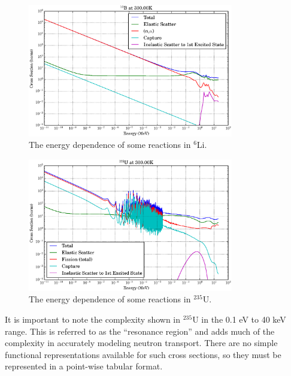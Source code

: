 \begin{figure}[h!]
  \centering
    \includegraphics[width=0.8\textwidth]{graphics/xs_li6.eps}
     \caption{The energy dependence of some reactions in $^6$Li.\label{xs_e_dependence_li}}
\end{figure}

\begin{figure}[h!]
  \centering
    \includegraphics[width=0.8\textwidth]{graphics/xs_u235.eps}
    \caption{The energy dependence of some reactions in $^{235}$U.   \label{xs_e_dependence_u}}
\end{figure}

It is important to note the complexity shown in $^{235}$U in the 0.1 eV to 40 keV range.  This is referred to as the ``resonance region'' and adds much of the complexity in accurately modeling neutron transport.  There are no simple functional representations available for such cross sections, so they must be represented in a point-wise tabular format.  


